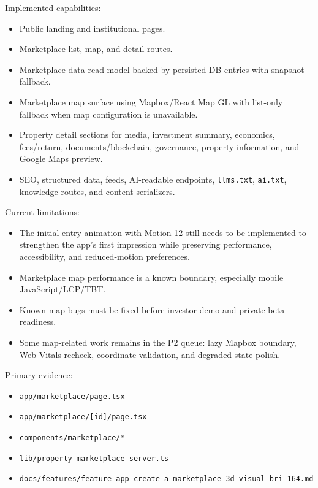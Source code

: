 \documentclass[
  10pt,
  letterpaper,
]{article}
\providecommand{\tightlist}{%
  \setlength{\itemsep}{0pt}\setlength{\parskip}{0pt}}
\let\oldtexttt\texttt
\renewcommand{\texttt}[1]{\oldtexttt{\small #1}}
\begin{document}
Implemented capabilities:

\begin{itemize}
\tightlist
\item
  Public landing and institutional pages.
\item
  Marketplace list, map, and detail routes.
\item
  Marketplace data read model backed by persisted DB entries with
  snapshot fallback.
\item
  Marketplace map surface using Mapbox/React Map GL with list-only
  fallback when map configuration is unavailable.
\item
  Property detail sections for media, investment summary, economics,
  fees/return, documents/blockchain, governance, property information,
  and Google Maps preview.
\item
  SEO, structured data, feeds, AI-readable endpoints, \texttt{llms.txt},
  \texttt{ai.txt}, knowledge routes, and content serializers.
\end{itemize}

Current limitations:

\begin{itemize}
\tightlist
\item
  The initial entry animation with Motion 12 still needs to be
  implemented to strengthen the app's first impression while preserving
  performance, accessibility, and reduced-motion preferences.
\item
  Marketplace map performance is a known boundary, especially mobile
  JavaScript/LCP/TBT.
\item
  Known map bugs must be fixed before investor demo and private beta
  readiness.
\item
  Some map-related work remains in the P2 queue: lazy Mapbox boundary,
  Web Vitals recheck, coordinate validation, and degraded-state polish.
\end{itemize}

Primary evidence:

\begin{itemize}
\tightlist
\item
  \texttt{app/marketplace/page.tsx}
\item
  \texttt{app/marketplace/{[}id{]}/page.tsx}
\item
  \texttt{components/marketplace/*}
\item
  \texttt{lib/property-marketplace-server.ts}
\item
  \texttt{docs/features/feature-app-create-a-marketplace-3d-visual-bri-164.md}
\end{itemize}
\end{document}
